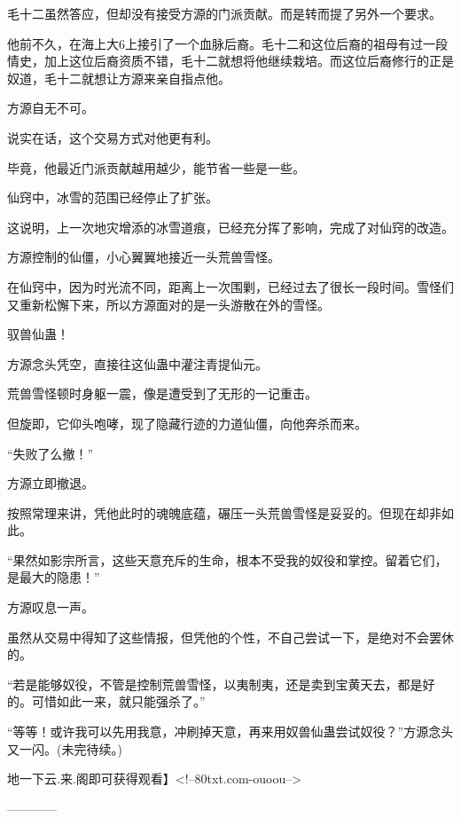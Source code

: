 \begin{this_body}
毛十二虽然答应，但却没有接受方源的门派贡献。而是转而提了另外一个要求。

他前不久，在海上大6上接引了一个血脉后裔。毛十二和这位后裔的祖母有过一段情史，加上这位后裔资质不错，毛十二就想将他继续栽培。而这位后裔修行的正是奴道，毛十二就想让方源来亲自指点他。

方源自无不可。

说实在话，这个交易方式对他更有利。

毕竟，他最近门派贡献越用越少，能节省一些是一些。

仙窍中，冰雪的范围已经停止了扩张。

这说明，上一次地灾增添的冰雪道痕，已经充分挥了影响，完成了对仙窍的改造。

方源控制的仙僵，小心翼翼地接近一头荒兽雪怪。

在仙窍中，因为时光流不同，距离上一次围剿，已经过去了很长一段时间。雪怪们又重新松懈下来，所以方源面对的是一头游散在外的雪怪。

驭兽仙蛊！

方源念头凭空，直接往这仙蛊中灌注青提仙元。

荒兽雪怪顿时身躯一震，像是遭受到了无形的一记重击。

但旋即，它仰头咆哮，现了隐藏行迹的力道仙僵，向他奔杀而来。

“失败了么撤！”

方源立即撤退。

按照常理来讲，凭他此时的魂魄底蕴，碾压一头荒兽雪怪是妥妥的。但现在却非如此。

“果然如影宗所言，这些天意充斥的生命，根本不受我的奴役和掌控。留着它们，是最大的隐患！”

方源叹息一声。

虽然从交易中得知了这些情报，但凭他的个性，不自己尝试一下，是绝对不会罢休的。

“若是能够奴役，不管是控制荒兽雪怪，以夷制夷，还是卖到宝黄天去，都是好的。可惜如此一来，就只能强杀了。”

“等等！或许我可以先用我意，冲刷掉天意，再来用奴兽仙蛊尝试奴役？”方源念头又一闪。(未完待续。)

地一下云.来.阁即可获得观看】<!--80txt.com-ouoou-->

------------

\end{this_body}

